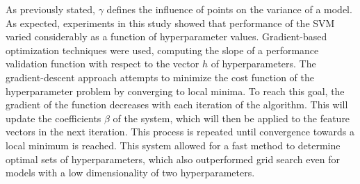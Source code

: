  As previously stated, $\gamma$ defines the influence of points on the variance of a model.  As expected, experiments in this study showed that performance of the SVM varied considerably as a function of hyperparameter values. Gradient-based optimization techniques were used, computing the slope of a performance validation function with respect to the vector $h$ of hyperparameters. The gradient-descent approach attempts to minimize the cost function of the hyperparameter problem by converging to local minima. To reach this goal, the gradient of the function decreases with each iteration of the algorithm. This will update the  coefficients $\beta$ of the system, which will then be applied to the feature vectors in the next iteration. This process is repeated until convergence towards a local minimum is reached. This system allowed for a fast method to determine optimal sets of hyperparameters, which also outperformed grid search even for models with a low dimensionality of two hyperparameters.

